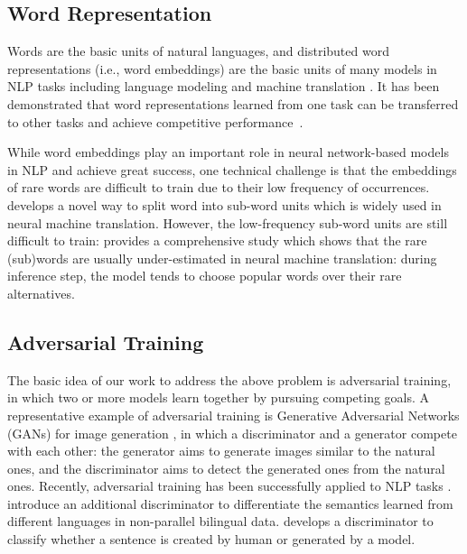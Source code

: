 \documentclass{article}
\begin{document}
\subsection{Word Representation}
Words are the basic units of natural languages, and distributed word representations (i.e., word embeddings) are the basic units of many models in NLP tasks including language modeling \cite{kim2016character,jozefowicz2016exploring} and machine translation \cite{bahdanau2014neural,cho2014learning,wu2016google,vaswani2017attention,gehring2017convolutional}. It has been demonstrated that word representations learned from one task can be transferred to other tasks and achieve competitive performance~\cite{arora2016simple}.

While word embeddings play an important role in neural network-based models in NLP and achieve great success, one technical challenge is that the embeddings of rare words are difficult to train due to their low frequency of occurrences. \cite{sennrich2015neural} develops a novel way to split word into sub-word units which is widely used in neural machine translation. However, the low-frequency sub-word units are still difficult to train: \cite{ott2018analyzing} provides a comprehensive study which shows that the rare (sub)words are usually under-estimated in neural machine translation: during inference step, the model tends to choose popular words over their rare alternatives.

\subsection{Adversarial Training}
The basic idea of our work to address the above problem is adversarial training, in which two or more models learn together by pursuing competing goals. A representative example of adversarial training is Generative Adversarial Networks (GANs) \cite{goodfellow2014generative,salimans2016improved} for image generation \cite{radford2015unsupervised,zhu2017unpaired,arjovsky2017wasserstein}, in which a discriminator and a generator compete with each other: the generator aims to generate images similar to the natural ones, and the discriminator aims to detect the generated ones from the natural ones. Recently, adversarial training has been successfully applied to NLP tasks \cite{conneau2017word,lample2017unsupervised,lamb2016professor}. \cite{conneau2017word,lample2017unsupervised} introduce an additional discriminator to differentiate the semantics learned from different languages in non-parallel bilingual data. \cite{lamb2016professor} develops a discriminator to classify whether a sentence is created by human or generated by a model.
\end{document}
